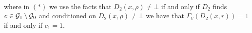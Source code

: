 \begin{align*}
\end{align*}
where in $(*)$ we use the facts that $D_2(x,\rho) \neq \bot$ if and only if $D_2$ finds $c \in \mathcal{G}_1 \setminus \mathcal{G}_0$
and conditioned on $D_2(x,\rho) \neq \bot$  we have that $\Gamma_V(D_2(x,r)) = 1$ if and only if $c_1 = 1$.